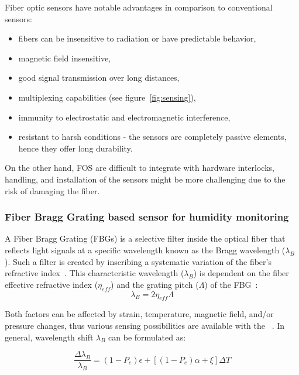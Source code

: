 Fiber optic sensors have notable advantages in comparison to conventional sensors:

\begin{itemize}
    \item fibers can be insensitive to radiation or have predictable behavior,
    \item magnetic field insensitive,
    \item good signal transmission over long distances,
    \item multiplexing capabilities (see figure~\ref{fig:sensing}),
    \item immunity to electrostatic and electromagnetic interference,
    \item resistant to harsh conditions - the sensors are completely passive elements, hence they offer long durability.
\end{itemize}

On the other hand, \gls{FOS} are difficult to integrate with hardware interlocks, handling, and installation of the sensors might be more challenging due to the risk of damaging the fiber.




\subsubsection{Fiber Bragg Grating based sensor for humidity monitoring }
\label{fbg}
A Fiber Bragg Grating (\glspl{FBG}) is a selective filter inside the optical fiber that reflects light signals at a specific wavelength known as the Bragg wavelength ($\lambda_{B}$). Such a filter is created by inscribing a systematic variation of the fiber's refractive index~\cite{fbg_overview}. This characteristic wavelength ($\lambda_{B}$) is dependent on the fiber effective refractive index ($\eta_{eff}$) and the grating pitch ($\Lambda$) of the \gls{FBG}~\cite{Othonos2000FiberBG}:
\begin{equation}
    \lambda_{B} = 2 \eta_{eff} \Lambda
\end{equation}

Both factors can be affected by strain, temperature, magnetic field, and/or pressure changes, thus various sensing possibilities are available with the ~\cite{Yun-Jiang_Rao_1997}. In general, wavelength shift $\lambda_{B}$ can be formulated as:

\begin{equation}
    \frac{\Delta\lambda_{B}}{\lambda_{B}}=(1-P_{e}) \epsilon + \left [(1-P_{e}) \alpha + \xi  \right ] \Delta T
\end{equation}

